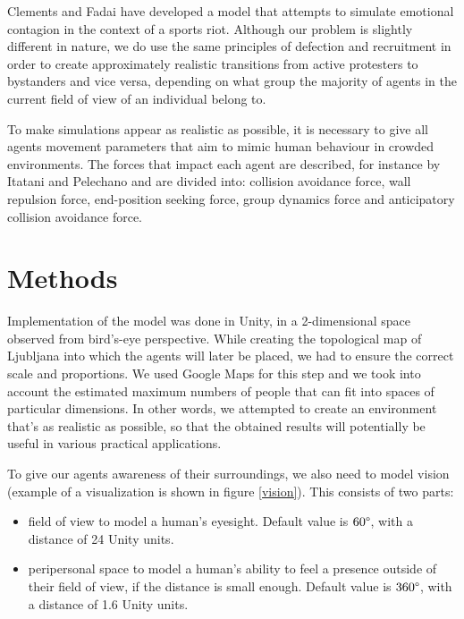 \documentclass[9pt]{pnas-new}
\begin{document}
\bigskip
Clements and Fadai \cite{sportsriots} have developed a model that attempts to simulate emotional contagion in the context of a sports riot. Although our problem is slightly different in nature, we do use the same principles of defection and recruitment in order to create approximately realistic transitions from active protesters to bystanders and vice versa, depending on what group the majority of agents in the current field of view of an individual belong to. 

\bigskip
To make simulations appear as realistic as possible, it is necessary to give all agents movement parameters that aim to mimic human behaviour in crowded environments. The forces that impact each agent are described, for instance by Itatani and Pelechano \cite{socialcrowdsimulation} and are divided into: collision avoidance force, wall repulsion force, end-position seeking force, group dynamics force and anticipatory collision avoidance force. 

\section*{Methods}

Implementation of the model was done in Unity, in a 2-dimensional space observed from bird's-eye perspective. While creating the topological map of Ljubljana into which the agents will later be placed, we had to ensure the correct scale and proportions. We used Google Maps for this step and we took into account the estimated maximum numbers of people that can fit into spaces of particular dimensions. In other words, we attempted to create an environment that's as realistic as possible, so that the obtained results will potentially be useful in various practical applications. 

\bigskip
To give our agents awareness of their surroundings, we also need to model vision (example of a visualization is shown in figure \ref{vision}). This consists of two parts: 
\begin{itemize}
    \item field of view to model a human's eyesight. Default value is \begin{math}60\degree\end{math}, with a distance of 24 Unity units.
    \item peripersonal space to model a human's ability to feel a presence outside of their field of view, if the distance is small enough. Default value is \begin{math}360\degree\end{math}, with a distance of 1.6 Unity units.
\end{itemize}
\end{document}
